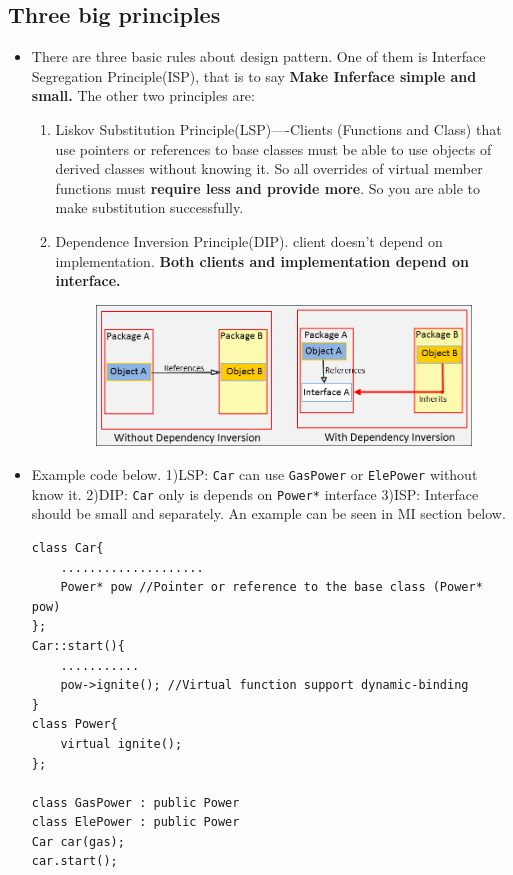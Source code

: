 \documentclass[a4paper,11pt,twoside]{book}
\begin{document}
\subsection{Three big principles}
\begin{itemize}
	\item There are three basic rules about design pattern. One of them is Interface Segregation Principle(ISP), that is to say \textbf{Make Inferface simple and small.} The other two principles are:
\begin{enumerate}
	\item Liskov Substitution Principle(LSP)----Clients (Functions and Class) that use pointers or references to base classes must be able to use objects of derived classes without knowing it.  So all overrides of virtual member functions must \textbf{require less and provide more}. So you are able to make substitution successfully.
	
	\item Dependence Inversion Principle(DIP). client doesn't depend on implementation. \textbf{Both clients and implementation depend on interface.}
	\begin{figure}[h]
		\centering
		\includegraphics[width=0.66\linewidth]{pics/DIP.png}
		\label{fig:dip}
	\end{figure}
	
\end{enumerate}

	\item Example code below.  1)LSP: \texttt{Car} can use  \texttt{GasPower} or \texttt{ElePower} without know it. 2)DIP: \texttt{Car} only is depends on \texttt{Power*} interface 3)ISP: Interface should be small and separately. An example can be seen in MI section below.

\begin{lstlisting}
class Car{
	....................
	Power* pow //Pointer or reference to the base class (Power* pow)
};
Car::start(){
	...........
	pow->ignite(); //Virtual function support dynamic-binding
}
class Power{
	virtual ignite();
};

class GasPower : public Power
class ElePower : public Power
Car car(gas);
car.start();
\end{lstlisting}

\end{itemize}
\end{document}
